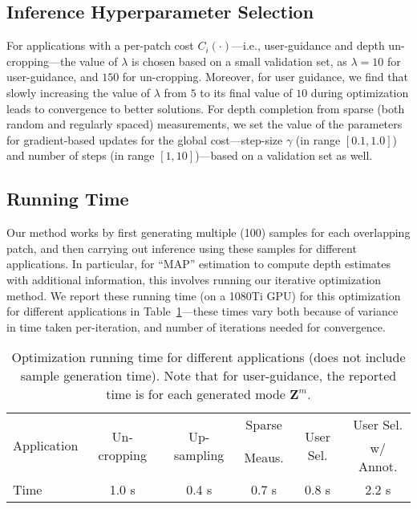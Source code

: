 \documentclass[10pt,twocolumn,letterpaper]{article}
\begin{document}
\subsection{Inference Hyperparameter Selection}
For applications with a per-patch cost $C_i(\cdot)$---i.e., user-guidance and depth un-cropping---the value of $\lambda$ is chosen based on a small validation set, as $\lambda=10$ for user-guidance, and $150$ for un-cropping. Moreover, for user guidance, we find that slowly increasing the value of $\lambda$ from $5$ to its final value of $10$ during optimization leads to convergence to better solutions. For depth completion from sparse (both random and regularly spaced) measurements, we set the value of the parameters for gradient-based updates for the global cost---step-size $\gamma$ (in range $[0.1,1.0]$) and number of steps (in range $[1,10]$)---based on a validation set as well.


\subsection{Running Time}
Our method works by first generating multiple (100) samples for each overlapping patch, and then carrying out inference using these samples for different applications. In particular, for ``MAP'' estimation to compute depth estimates with additional information, this involves running our iterative optimization method. We report these running time (on a 1080Ti GPU) for this optimization for different applications in Table~\ref{tab:runtime}---these times vary both because of variance in time taken per-iteration, and number of iterations needed for convergence.

\begin{table}[!t]\small
  \begin{center}
     \centering
     \begin{tabular}{lccccc}\toprule
       \multirow{2}{*}{Application}&\multirow{2}{*}{Un-cropping}&\multirow{2}{*}{Up-sampling}&Sparse&\multirow{2}{*}{User Sel.}&User Sel.\\
                                   & & & Meaus.& &w/ Annot.\\\midrule
       Time & 1.0 s & 0.4 s & 0.7 s & 0.8 s & 2.2 s\\\bottomrule
     \end{tabular}
   \end{center}
     \caption{Optimization running time for different applications (does not include sample generation time). Note that for user-guidance, the reported time is for each generated mode $\mathbf{Z}^m$.}
  \label{tab:runtime}
\end{table}
\end{document}
